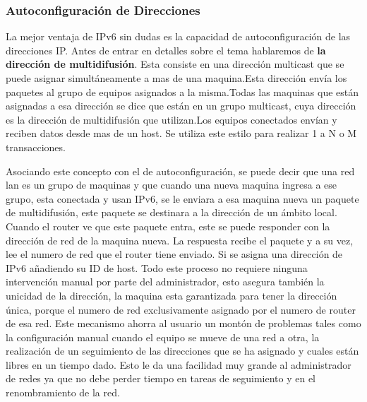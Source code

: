 \documentclass[11pt,a4paper]{article}
\begin{document}
\subsubsection{Autoconfiguración de Direcciones}
La mejor ventaja de IPv6 sin dudas es la capacidad de autoconfiguración de las direcciones IP. Antes 
de entrar en detalles sobre el tema hablaremos de \textbf{la dirección de multidifusión}. Esta 
consiste en una dirección multicast que se puede asignar simultáneamente a mas de una maquina.Esta 
dirección envía los paquetes al grupo de equipos asignados a la misma.Todas las maquinas que están 
asignadas a esa dirección se dice que están en un grupo multicast, cuya dirección es la dirección  
de multidifusión que utilizan.Los equipos conectados envían y reciben datos desde mas de un host. Se 
utiliza este estilo para realizar 1 a N o M transacciones.\par
Asociando este concepto con el de autoconfiguración, se puede decir que una red lan es un grupo de 
maquinas y que cuando una nueva maquina ingresa a ese grupo, esta conectada y usan IPv6, se le 
enviara a esa maquina nueva un paquete de multidifusión, este paquete se destinara a la dirección 
de un ámbito local. Cuando el router ve que este paquete entra, este se puede responder con la 
dirección de red de la maquina nueva. La respuesta recibe el paquete y a su vez, lee el numero de 
red que el router tiene enviado. Si se asigna una dirección de IPv6 añadiendo su ID de host. Todo 
este proceso no requiere ninguna intervención manual por parte del administrador, esto asegura 
también la unicidad de la dirección, la maquina esta garantizada para tener la dirección única, 
porque el numero de red exclusivamente asignado por el numero de router de esa red.
Este mecanismo ahorra al usuario un montón de problemas tales como la configuración manual cuando el 
equipo se mueve de una red a otra, la realización de un seguimiento de las direcciones que se ha 
asignado y cuales están libres en un tiempo dado.
Esto le da una facilidad muy grande al administrador de redes ya que no debe perder tiempo en tareas 
de seguimiento y en el renombramiento de la red.
\end{document}

